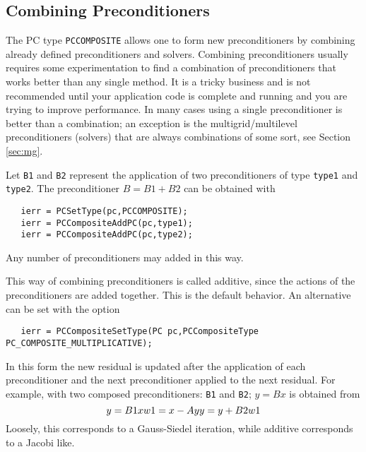 \subsection{Combining Preconditioners} 

The PC type {\tt PCCOMPOSITE}  allows one to form 
new preconditioners by combining already defined preconditioners and 
solvers. Combining preconditioners usually requires some experimentation
to find a combination of preconditioners that works better than any
single method. It is a tricky business and is not recommended until 
your application code is complete and running and you are trying to 
improve performance. In many cases using a single preconditioner is better
than a combination; an exception is the multigrid/multilevel preconditioners
(solvers) that are always combinations of some sort, see Section \ref{sec:mg}.

Let {\tt B1} and {\tt B2} represent the application of two 
preconditioners of type {\tt type1} and {\tt type2}. The preconditioner
$ B = B1 + B2 $ can be obtained with
\begin{verbatim}
   ierr = PCSetType(pc,PCCOMPOSITE);
   ierr = PCCompositeAddPC(pc,type1);
   ierr = PCCompositeAddPC(pc,type2);
\end{verbatim}
Any number of preconditioners may added in this way. 

This way of combining preconditioners is called additive, since 
the actions of the preconditioners are added together. This is the 
default behavior. An alternative can be set with the option
\begin{verbatim}
   ierr = PCCompositeSetType(PC pc,PCCompositeType PC_COMPOSITE_MULTIPLICATIVE);
\end{verbatim}
 
  
In this form the new residual is updated after the application of 
each preconditioner and the next preconditioner applied to the next 
residual. For example, with two composed preconditioners: {\tt B1} and 
{\tt B2}; $ y = B x $ is obtained from
\[
  y   = B1 x \\
  w1  = x - A y \\
  y   = y + B2 w1 
\]
Loosely, this corresponds to a Gauss-Siedel iteration, while
additive corresponds to a Jacobi like.

